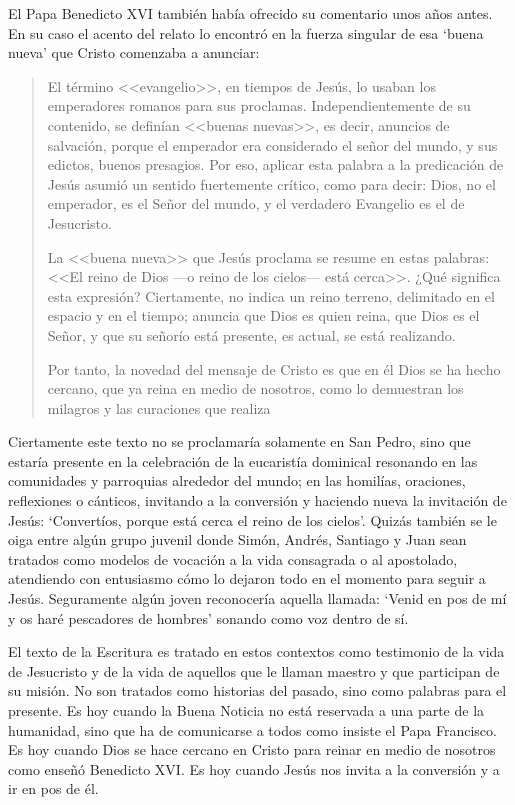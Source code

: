 El Papa Benedicto XVI también había ofrecido su comentario unos años antes. En su caso el acento del relato lo encontró en la fuerza singular de esa `buena nueva' que Cristo comenzaba a anunciar:
\blockquote[{\cite{benedicto2008angelus}}]{El término <<evangelio>>, en tiempos de Jesús, lo usaban los emperadores romanos para sus proclamas. Independientemente de su contenido, se definían <<buenas nuevas>>, es decir, anuncios de salvación, porque el emperador era considerado el señor del mundo, y sus edictos, buenos presagios. Por eso, aplicar esta palabra a la predicación de Jesús asumió un sentido fuertemente crítico, como para decir: Dios, no el emperador, es el Señor del mundo, y el verdadero Evangelio es el de Jesucristo.

La <<buena nueva>> que Jesús proclama se resume en estas palabras: <<El reino de Dios ---o reino de los cielos--- está cerca>>. ¿Qué significa esta expresión? Ciertamente, no indica un reino terreno, delimitado en el espacio y en el tiempo; anuncia que Dios es quien reina, que Dios es el Señor, y que su señorío está presente, es actual, se está realizando.

Por tanto, la novedad del mensaje de Cristo es que en él Dios se ha hecho cercano, que ya reina en medio de nosotros, como lo demuestran los milagros y las curaciones que realiza}.

Ciertamente este texto no se proclamaría solamente en San Pedro, sino que estaría presente en la celebración de la eucaristía dominical resonando en las comunidades y parroquias alrededor del mundo; en las homilías, oraciones, reflexiones o cánticos, invitando a la conversión y haciendo nueva la invitación de Jesús: \enquote*{Convertíos, porque está cerca el reino de los cielos}. Quizás también se le oiga entre algún grupo juvenil donde Simón, Andrés, Santiago y Juan sean tratados como modelos de vocación a la vida consagrada o al apostolado, atendiendo con entusiasmo cómo lo dejaron todo en el momento para seguir a Jesús. Seguramente algún joven reconocería aquella llamada: \enquote*{Venid en pos de mí y os haré pescadores de hombres} sonando como voz dentro de sí.

El texto de la Escritura es tratado en estos contextos como testimonio de la vida de Jesucristo y de la vida de aquellos que le llaman maestro y que participan de su misión. No son tratados como historias del pasado, sino como palabras para el presente. Es hoy cuando la Buena Noticia no está reservada a una parte de la humanidad, sino que ha de comunicarse a todos como insiste el Papa Francisco. Es hoy cuando Dios se hace cercano en Cristo para reinar en medio de nosotros como enseñó Benedicto XVI. Es hoy cuando Jesús nos invita a la conversión y a ir en pos de él.

